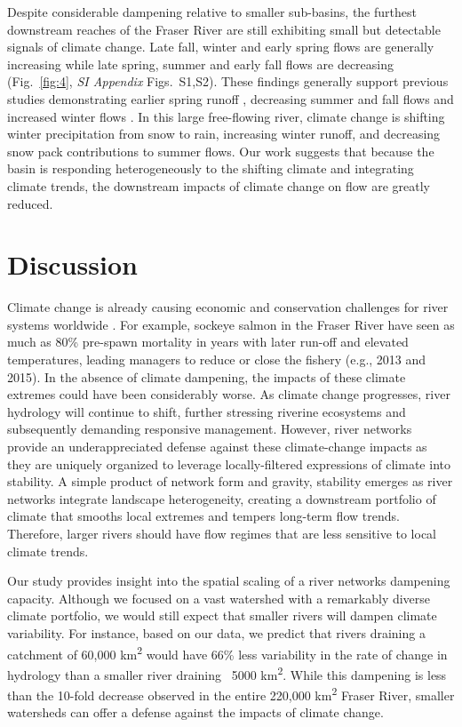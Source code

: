 \documentclass[9pt,twocolumn,twoside,lineno]{pnas-new}
\begin{document}
Despite considerable dampening relative to smaller sub-basins, the furthest downstream reaches of the Fraser River are still exhibiting small but detectable signals of climate change. Late fall, winter and early spring flows are generally increasing while late spring, summer and early fall flows are decreasing (Fig.~\ref{fig:4}, \textit{SI Appendix} Figs.~S1,S2). These findings generally support previous studies demonstrating earlier spring runoff \cite{Dery:2012}, decreasing summer and fall flows \cite{Stahl:2006} and increased winter flows \cite{Healey:2011}. In this large free-flowing river, climate change is shifting winter precipitation from snow to rain, increasing winter runoff, and decreasing snow pack contributions to summer flows. Our work suggests that because the basin is responding heterogeneously to the shifting climate and integrating climate trends, the downstream impacts of climate change on flow are greatly reduced. 

\section*{Discussion}
Climate change is already causing economic and conservation challenges for river systems worldwide \cite{Palmer:2009,Pecl:2017}. For example, sockeye salmon in the Fraser River have seen as much as 80\% pre-spawn mortality in years with later run-off and elevated temperatures, leading managers to reduce or close the fishery (e.g., 2013 and 2015). In the absence of climate dampening, the impacts of these climate extremes could have been considerably worse. As climate change progresses, river hydrology will continue to shift, further stressing riverine ecosystems and subsequently demanding responsive management. However, river networks provide an underappreciated defense against these climate-change impacts as they are uniquely organized to leverage locally-filtered expressions of climate into stability. A simple product of network form and gravity, stability emerges as river networks integrate landscape heterogeneity, creating a downstream portfolio of climate that smooths local extremes and tempers long-term flow trends. Therefore, larger rivers should have flow regimes that are less sensitive to local climate trends.

Our study provides insight into the spatial scaling of a river networks dampening capacity. Although we focused on a vast watershed with a remarkably diverse climate portfolio, we would still expect that smaller rivers will dampen climate variability. For instance, based on our data, we predict that rivers draining a catchment of 60,000 km\textsuperscript{2} would have 66\% less variability in the rate of change in hydrology than a smaller river draining ~5000 km\textsuperscript{2}. While this dampening is less than the 10-fold decrease observed in the entire 220,000 km\textsuperscript{2} Fraser River, smaller watersheds can offer a defense against the impacts of climate change.
\end{document}
